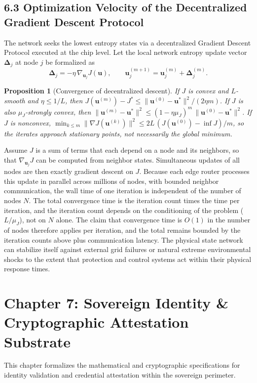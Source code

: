 \documentclass[11pt,a4paper]{article}
\theoremstyle{definition}
\theoremstyle{plain}
\newtheorem{proposition}{Proposition}
\theoremstyle{remark}
\begin{document}
\subsection*{6.3 Optimization Velocity of the Decentralized Gradient Descent Protocol}
The network seeks the lowest entropy states via a decentralized Gradient Descent Protocol executed at the chip level. Let the local network entropy update vector $\boldsymbol\Delta_j$ at node $j$ be formalized as
\begin{equation}
\boldsymbol\Delta_j = -\eta\, \nabla_{\mathbf u_j} J(\mathbf u),
\qquad
\mathbf u_j^{(m+1)} = \mathbf u_j^{(m)} + \boldsymbol\Delta_j^{(m)} .
\end{equation}

\begin{proposition}[Convergence of decentralized descent]\label{prop:gd}
If $J$ is convex and $L$-smooth and $\eta \le 1/L$, then $J(\mathbf u^{(m)}) - J^{*} \le \|\mathbf u^{(0)} - \mathbf u^{*}\|^{2} / (2\eta m)$. If $J$ is also $\mu_J$-strongly convex, then $\|\mathbf u^{(m)} - \mathbf u^{*}\|^{2} \le (1 - \eta\mu_J)^{m}\,\|\mathbf u^{(0)} - \mathbf u^{*}\|^{2}$. If $J$ is nonconvex, $\min_{k \le m}\|\nabla J(\mathbf u^{(k)})\|^2 \le 2L\,(J(\mathbf u^{(0)}) - \inf J)/m$, so the iterates approach stationary points, not necessarily the global minimum.
\end{proposition}

Assume $J$ is a sum of terms that each depend on a node and its neighbors, so that $\nabla_{\mathbf u_j} J$ can be computed from neighbor states. Simultaneous updates of all nodes are then exactly gradient descent on $J$. Because each edge router processes this update in parallel across millions of nodes, with bounded neighbor communication, the wall time of one iteration is independent of the number of nodes $N$. The total convergence time is the iteration count times the time per iteration, and the iteration count depends on the conditioning of the problem ($L/\mu_J$), not on $N$ alone. The claim that convergence time is $O(1)$ in the number of nodes therefore applies per iteration, and the total remains bounded by the iteration counts above plus communication latency. The physical state network can stabilize itself against external grid failures or natural extreme environmental shocks to the extent that protection and control systems act within their physical response times.

\clearpage
\clearpage
\section*{Chapter 7: Sovereign Identity \& Cryptographic Attestation Substrate}
This chapter formalizes the mathematical and cryptographic specifications for identity validation and credential attestation within the sovereign perimeter.
\end{document}
